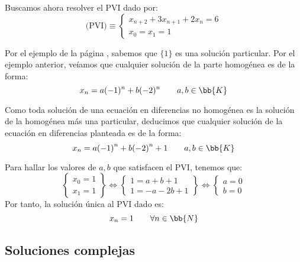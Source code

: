 \begin{ejemplo}
    Buscamos ahora resolver el PVI dado por:
    \begin{equation*}
        \text{(PVI)}\equiv \left\{
        \begin{array}{l}
            x_{n+2} + 3x_{n+1} + 2x_n = 6 \\
            x_0 = x_1 = 1
        \end{array}\right.
    \end{equation*}
    
    Por el ejemplo de la página \pageref{ejemplo:uso_L}, sabemos que $\{1\}$ es una solución particular. Por el ejemplo anterior, veíamos que cualquier solución de la parte homogénea es de la forma:
    \begin{equation*}
        x_n = a(-1)^n + b(-2)^n \qquad a,b\in \bb{K}
    \end{equation*}

    Como toda solución de una ecuación en diferencias no homogénea es la solución de la homogénea más una particular, deducimos que cualquier solución de la ecuación en diferencias planteada es de la forma:
    \begin{equation*}
        x_n = a{(-1)}^n + b{(-2)}^n + 1\qquad a,b\in \bb{K}
    \end{equation*}

    Para hallar los valores de $a,b$ que satisfacen el PVI, tenemos que:
    \begin{equation*}
        \left\{\begin{array}{l}
            x_0=1\\x_1=1
        \end{array}\right\}
        \Longleftrightarrow
        \left\{\begin{array}{l}
            1=a+b+1\\
            1 = -a-2b+1
        \end{array}\right\}
        \Longleftrightarrow
        \left\{\begin{array}{l}
            a=0\\
            b=0
        \end{array}\right.
    \end{equation*}
    Por tanto, la solución única al PVI dado es:
    \begin{equation*}
        x_n = 1 \qquad \forall n\in \bb{N}
    \end{equation*}
\end{ejemplo}

\subsection{Soluciones complejas}

